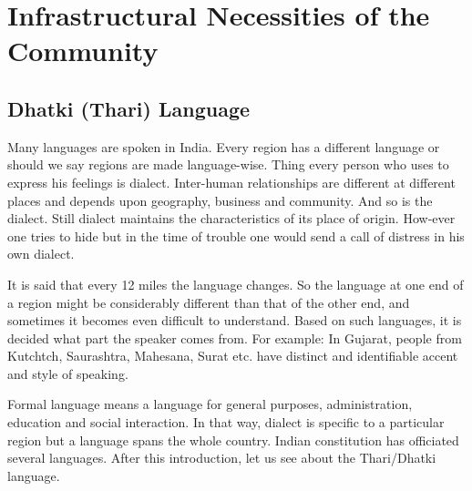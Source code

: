 \chapter{Infrastructural Necessities of the Community}
\section{Dhatki (Thari) Language}
Many languages are spoken in India. Every region has a different language or
should we say regions are made language-wise. Thing every person who uses to
express his feelings is dialect. Inter-human relationships are different at
different places and depends upon geography, business and community. And so is
the dialect. Still dialect maintains the characteristics of its place of origin.
How-ever one tries to hide but in the time of trouble one would send a call of
distress in his own dialect.

It is said that every 12 miles the language changes. So the language at one end
of a region might be considerably different than that of the other end, and
sometimes it becomes even difficult to understand. Based on such languages, it
is decided what part the speaker comes from. For example: In Gujarat, people
from Kutchtch, Saurashtra, Mahesana, Surat etc. have distinct and identifiable
accent and style of speaking.

Formal language means a language for general purposes, administration, education
and social interaction. In that way, dialect is specific to a particular region
but a language spans the whole country. Indian constitution has officiated
several languages. After this introduction, let us see about the Thari/Dhatki
language.

